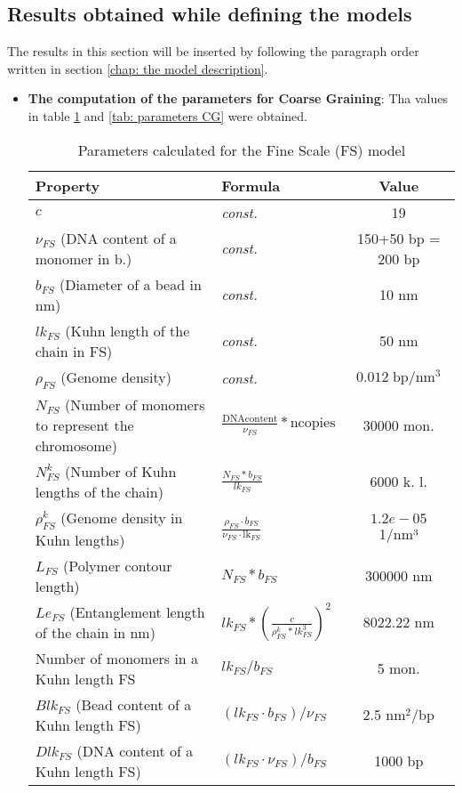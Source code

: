 \subsection{Results obtained while defining the models}
The results in this section will be inserted by following the paragraph order written in section \ref{chap: the model description}.
\begin{itemize}
    \item \textbf{The computation of the parameters for Coarse Graining}: Tha values in table \ref{tab: parameters FS} and \ref{tab: parameters CG} were obtained.

\begin{table}[H]

    \begin{tabular}{|l|l|c|}
    \hline
    \textbf{Property} & \textbf{Formula} & \textbf{Value}\\
    \hline
    \textbf{$c$} & \textit{const.} & 19\\
    \hline
    \textbf{$\nu_{FS}$} (DNA content of a monomer in b.) & \textit{const.} & 150+50 bp = 200 bp\\
    \hline
    \textbf{$b_{FS}$} (Diameter of a bead in nm) & \textit{const.} & 10 nm\\
    \hline
    \textbf{$lk_{FS}$} (Kuhn length of the chain  in FS) & \textit{const.} & 50 nm \\
    \hline
    \textbf{$\rho_{FS}$} (Genome density) &\textit{const.} & $0.012\; \text{bp}/\text{nm}^3$\cite{golkaramRoleChromatinDensity2017} \\ 
    \hline
    \textbf{$N_{FS}$} (Number of monomers to represent the chromosome) & $\frac{\text{DNAcontent}}{\nu_{FS}} * \text{ncopies}$ & 30000 mon.\\
    \hline
    \textbf{$N^k_{FS}$} (Number of Kuhn lengths of the chain) & $\frac{N_{FS} * b_{FS}}{lk_{FS}}$ & 6000 k. l.\\
    \hline
    \textbf{$\rho^k_{FS}$} (Genome density in Kuhn lengths) & $\frac{\rho_{FS} \cdot b_{FS}}{\nu_{FS} \cdot \text{lk}_{FS}}$& $1.2e-05$ 1/nm³\\
    \hline
    \textbf{$L_{FS}$} (Polymer contour length) & $N_{FS} * b_{FS}$ & 300000 nm\\
    \hline
    \textbf{$Le_{FS}$} (Entanglement length of the chain in nm) & $lk_{FS} * \left(\frac{c}{\rho^k_{FS} * lk_{FS}^3}\right)^2$ & 8022.22 nm\\
    \hline
    Number of monomers in a Kuhn length FS & $lk_{FS}/b_{FS}$ & 5 mon.\\
    \hline
    $Blk_{FS}$ (Bead content of a Kuhn length FS) & $(lk_{FS} \cdot b_{FS})/\nu_{FS}$ & 2.5 $\text{nm}^2$/bp  \\
    \hline
    $Dlk_{FS}$ (DNA content of a Kuhn length FS) & $(lk_{FS} \cdot \nu_{FS})/b_{FS}$ & 1000 $\text{bp}$\\
    \hline
    \end{tabular}
    \label{tab: parameters FS}
    \caption{Parameters calculated for the Fine Scale (FS) model}
    \end{table}
    

\end{itemize}
